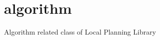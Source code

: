 \hypertarget{group___algorithm_group}{}\section{algorithm}
\label{group___algorithm_group}
Algorithm related class of Local Planning Library 